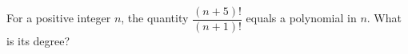 For a positive integer $n$, the quantity $\dfrac{(n+5)!}{(n+1)!}$ equals a polynomial in $n$. What is its degree?
